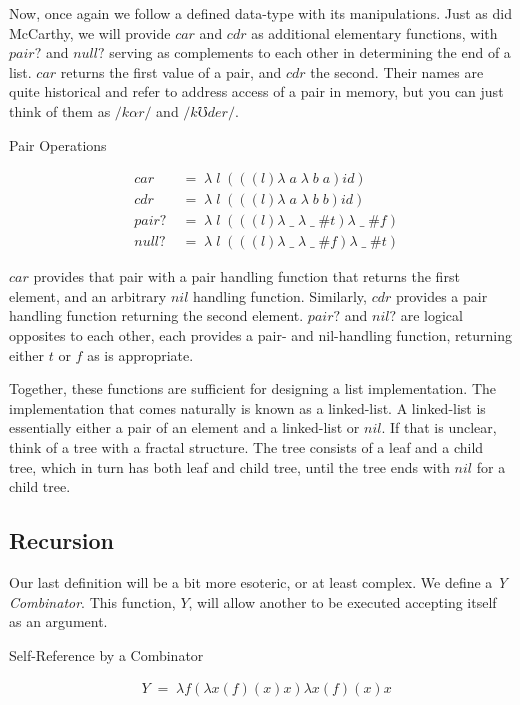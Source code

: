 Now, once again we follow a defined data-type with its manipulations. Just as did 
McCarthy, we will provide $car$ and $cdr$ as additional elementary functions, with 
$pair?$ and $null?$ serving as complements to each other in determining the end of 
a list. $car$ returns the first value of a pair, and $cdr$ the second. Their names 
are quite historical and refer to address access of a pair in memory, but you can 
just think of them as $/k \alpha r/$ and $/k \mho d e r/$.

Pair Operations
\begin{figure}[htp]
\caption{}\label{scheme}
\begin{align*}
& car \; &= \; \lambda \; l \; (((l)\lambda \; a \; \lambda \; b \; a)id)
\\& cdr \; &= \; \lambda \; l \; (((l)\lambda \; a \; \lambda \; b \; b)id)
\\& pair? \; &= \; \lambda \; l \; (((l)\lambda \; \_ \; \lambda \; \_ \; \#t)\lambda \; \_ \; \#f)
\\& null? \; &= \; \lambda \; l \; (((l)\lambda \; \_ \; \lambda \; \_ \; \#f)\lambda \; \_ \; \#t)
\end{align*}
\end{figure}

$car$ provides that pair with a pair handling function that returns the first 
element, and an arbitrary $nil$ handling function. Similarly, $cdr$ provides a 
pair handling function returning the second element. $pair?$ and $nil?$ are 
logical opposites to each other, each provides a pair- and nil-handling function, 
returning either $t$ or $f$ as is appropriate.

Together, these functions are sufficient for designing a list implementation. The 
implementation that comes naturally is known as a linked-list. A linked-list is 
essentially either a pair of an element and a linked-list or $nil$. If that is 
unclear, think of a tree with a fractal structure. The tree consists of a leaf and 
a child tree, which in turn has both leaf and child tree, until the tree ends with 
$nil$ for a child tree.

\subsection{Recursion}
Our last definition will be a bit more esoteric, or at least complex. We define a 
\emph{Y Combinator}. This function, $Y$, will allow another to be executed accepting 
itself as an argument.

Self-Reference by a Combinator
\begin{figure}[htp]
\caption{}\label{scheme}
\begin{align*}
& Y \; = \; λf(λx(f)(x)x)λx(f)(x)x
\end{align*}
\end{figure}

